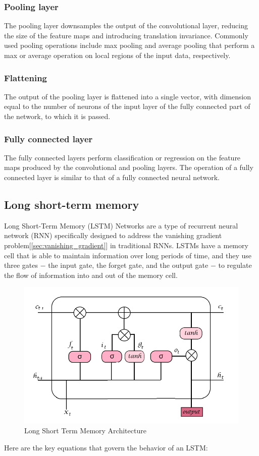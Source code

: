\documentclass[a4paper, noexaminfo]{sapthesis}
\begin{document}
\subsubsection{Pooling layer}
The pooling layer downsamples the output of the convolutional 
layer, reducing the size of the feature maps and introducing translation
 invariance. Commonly used pooling operations include max pooling and
average pooling that perform a max or average operation on local regions
 of the input data, respectively.
\subsubsection{Flattening}
The output of the pooling layer is flattened into a
 single vector, with dimension equal to the number of neurons of the
 input layer of the fully connected part of the network,
 to which it is passed.
\subsubsection{Fully connected layer}
The fully connected layers perform classification
 or regression on the feature maps produced by the convolutional and
  pooling layers. The operation of a fully connected layer is similar 
  to that of a fully connected neural network.
\subsection{Long short-term memory}
Long Short-Term Memory (LSTM) Networks are a type of recurrent neural 
network (RNN) specifically designed to address the vanishing 
gradient problem[\ref{sec:vanishing_gradient}] in traditional RNNs. LSTMs have a memory cell that is
 able to maintain information over long periods of time, and they use 
 three gates $-$ the input gate, the forget gate, and the output gate $-$
  to regulate the flow of information into and out of the memory cell.
  \begin{figure}[h]
    \includegraphics[scale=0.55]{lstm}
    \centering
    \caption{Long Short Term Memory Architecture}\label{fig:lstm}
    \end{figure} 
Here are the key equations that govern the behavior of an LSTM:
\end{document}
